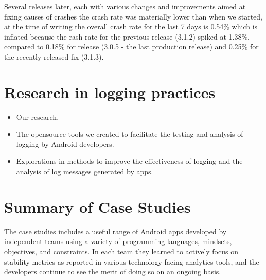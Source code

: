 Several releases later, each with various changes and improvements aimed at fixing causes of crashes the crash rate was materially lower than when we started, at the time of writing the overall crash rate for the last 7 days is 0.54\% which is inflated because the rash rate for the previous release (3.1.2) spiked at 1.38\%, compared to 0.18\% for release (3.0.5 -  the last production release) and 0.25\% for the recently released fix (3.1.3).








\section{Research in logging practices}

\begin{itemize}
    \item Our research.
    \item The opensource tools we created to facilitate the testing and analysis of logging by Android developers.
    \item Explorations in methods to improve the effectiveness of logging and the analysis of log messages generated by apps.
\end{itemize}




\section{Summary of Case Studies}
The case studies includes a useful range of Android apps developed by independent teams using a variety of programming languages, mindsets, objectives, and constraints. In each team they learned to actively focus on stability metrics as reported in various technology-facing analytics tools, and the developers continue to see the merit of doing so on an ongoing basis.